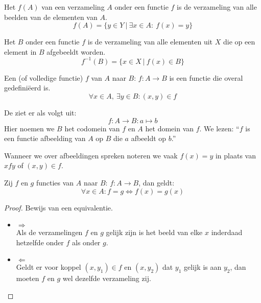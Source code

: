 \documentclass[main.tex]{subfiles}
\begin{document}
\begin{de}
  Het  $f(A)$ van een verzameling $A$ onder een functie $f$ is de verzameling van alle beelden van de elementen van $A$.
  \[ f(A) = \{ y \in Y \ |\ \exists x \in A:\ f(x) = y \} \]
\end{de}

\begin{de}
  Het  $B$ onder een functie $f$ is de verzameling van alle elementen uit $X$ die op een element in $B$ afgebeeldt worden.
  \[ f^{-1}(B) = \{ x \in X \ |\ f(x) \in B \} \]
\end{de}

\begin{de}
  Een  (of volledige functie) $f$ van $A$ naar $B$: $f: A \rightarrow B$ is een functie die overal gedefini\"eerd is.
  \[ \forall x \in A,\ \exists y \in B: (x,y) \in f \]
\end{de} 
 
\begin{de}
  De  ziet er als volgt uit:
  \[ f: A \rightarrow B: a \mapsto b \]
  Hier noemen we $B$ het codomein van $f$ en $A$ het domein van $f$.
  We lezen: ``$f$ is een functie afbeelding van $A$ op $B$ die $a$ afbeeldt op $b$.''
\end{de} 
 
\begin{de}
  Wanneer we over afbeeldingen spreken noteren we vaak $f(x) = y$ in plaats van $x f y$ of $(x,y) \in f$.
\end{de}


\begin{st}
  Zij $f$ en $g$ functies van $A$ naar $B$: $f: A \rightarrow B$, dan geldt:
  \[ \forall x \in A: f = g \Leftrightarrow f(x) = g(x) \]  
  \begin{proof}
    Bewijs van een equivalentie.
    \begin{itemize}
    \item $\Rightarrow$\\
      Als de verzamelingen $f$ en $g$ gelijk zijn is het beeld van elke $x$ inderdaad hetzelfde onder $f$ als onder $g$.
    \item $\Leftarrow$\\
      Geldt er voor koppel $(x,y_{1}) \in f$ en $(x,y_{2})$ dat $y_{1}$ gelijk is aan $y_{2}$, dan moeten $f$ en $g$ wel dezelfde verzameling zij.
    \end{itemize}
  \end{proof}
\end{st}
\end{document}
